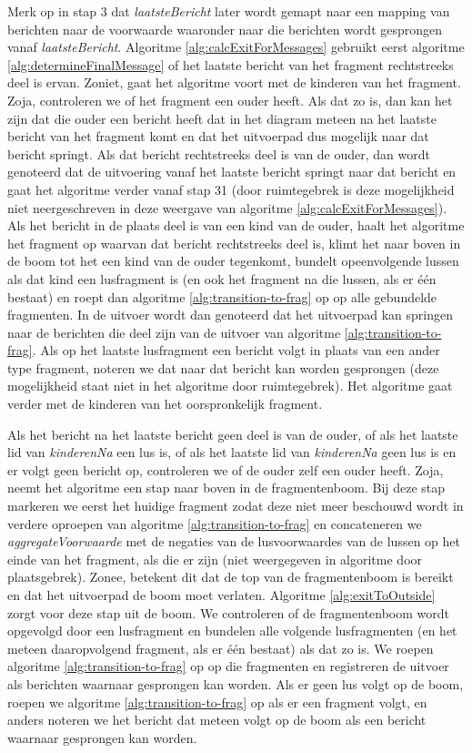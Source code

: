 Merk op in stap 3 dat \textit{laatsteBericht} later wordt gemapt naar een mapping van berichten naar de voorwaarde waaronder naar die berichten wordt gesprongen vanaf \textit{laatsteBericht}.
Algoritme \ref{alg:calcExitForMessages} gebruikt eerst algoritme \ref{alg:determineFinalMessage} of het laatste bericht van het fragment rechtstreeks deel is ervan. Zoniet, gaat het algoritme voort met de kinderen van het fragment. Zoja, controleren we of het fragment een ouder heeft. Als dat zo is, dan kan het zijn dat die ouder een bericht heeft dat in het diagram meteen na het laatste bericht van het fragment komt en dat het uitvoerpad dus mogelijk naar dat bericht springt. Als dat bericht rechtstreeks deel is van de ouder, dan wordt genoteerd dat de uitvoering vanaf het laatste bericht springt naar dat bericht en gaat het algoritme verder vanaf stap 31 (door ruimtegebrek is deze mogelijkheid niet neergeschreven in deze weergave van algoritme \ref{alg:calcExitForMessages}). Als het bericht in de plaats deel is van een kind van de ouder, haalt het algoritme het fragment op waarvan dat bericht rechtstreeks deel is, klimt het naar boven in de boom tot het een kind van de ouder tegenkomt, bundelt opeenvolgende lussen als dat kind een lusfragment is (en ook het fragment na die lussen, als er \'e\'en bestaat) en roept dan algoritme \ref{alg:transition-to-frag} op op alle gebundelde fragmenten. In de uitvoer wordt dan genoteerd dat het uitvoerpad kan springen naar de berichten die deel zijn van de uitvoer van algoritme \ref{alg:transition-to-frag}. Als op het laatste lusfragment een bericht volgt in plaats van een ander type fragment, noteren we dat naar dat bericht kan worden gesprongen (deze mogelijkheid staat niet in het algoritme door ruimtegebrek). Het algoritme gaat verder met de kinderen van het oorspronkelijk fragment.

Als het bericht na het laatste bericht geen deel is van de ouder, of als het laatste lid van \textit{kinderenNa} een lus is, of als het laatste lid van \textit{kinderenNa} geen lus is en er volgt geen bericht op, controleren we of de ouder zelf een ouder heeft. Zoja, neemt het algoritme een stap naar boven in de fragmentenboom. Bij deze stap markeren we eerst het huidige fragment zodat deze niet meer beschouwd wordt in verdere oproepen van algoritme \ref{alg:transition-to-frag} en concateneren we \textit{aggregateVoorwaarde} met de negaties van de lusvoorwaardes van de lussen op het einde van het fragment, als die er zijn (niet weergegeven in algoritme door plaatsgebrek). Zonee, betekent dit dat de top van de fragmentenboom is bereikt en dat het uitvoerpad de boom moet verlaten. Algoritme \ref{alg:exitToOutside} zorgt voor deze stap uit de boom. We controleren of de fragmentenboom wordt opgevolgd door een lusfragment en bundelen alle volgende lusfragmenten (en het meteen daaropvolgend fragment, als er \'e\'en bestaat) als dat zo is. We roepen algoritme \ref{alg:transition-to-frag} op op die fragmenten en registreren de uitvoer als berichten waarnaar gesprongen kan worden. Als er geen lus volgt op de boom, roepen we algoritme \ref{alg:transition-to-frag} op als er een fragment volgt, en anders noteren we het bericht dat meteen volgt op de boom als een bericht waarnaar gesprongen kan worden.

